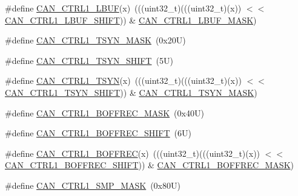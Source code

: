 \begin{DoxyCompactItemize}
\item 
\#define \mbox{\hyperlink{group___c_a_n___register___masks_ga13ecdb7d2b91cd6756605304611656b2}{C\+A\+N\+\_\+\+C\+T\+R\+L1\+\_\+\+L\+B\+UF}}(x)~(((uint32\+\_\+t)(((uint32\+\_\+t)(x)) $<$$<$ \mbox{\hyperlink{group___c_a_n___register___masks_ga1ebb72a42560e1f78bb6f10cfeec8945}{C\+A\+N\+\_\+\+C\+T\+R\+L1\+\_\+\+L\+B\+U\+F\+\_\+\+S\+H\+I\+FT}})) \& \mbox{\hyperlink{group___c_a_n___register___masks_ga91b1b6502a9996e9639d28760d00ee88}{C\+A\+N\+\_\+\+C\+T\+R\+L1\+\_\+\+L\+B\+U\+F\+\_\+\+M\+A\+SK}})
\item 
\#define \mbox{\hyperlink{group___c_a_n___register___masks_ga2ceb4b7bca561020b4899dd2087e5260}{C\+A\+N\+\_\+\+C\+T\+R\+L1\+\_\+\+T\+S\+Y\+N\+\_\+\+M\+A\+SK}}~(0x20\+U)
\item 
\#define \mbox{\hyperlink{group___c_a_n___register___masks_gaff5bfe8a985c0511b72d2518b0bb1708}{C\+A\+N\+\_\+\+C\+T\+R\+L1\+\_\+\+T\+S\+Y\+N\+\_\+\+S\+H\+I\+FT}}~(5\+U)
\item 
\#define \mbox{\hyperlink{group___c_a_n___register___masks_gae6271a14b5458a165d99c9aa425dc0b2}{C\+A\+N\+\_\+\+C\+T\+R\+L1\+\_\+\+T\+S\+YN}}(x)~(((uint32\+\_\+t)(((uint32\+\_\+t)(x)) $<$$<$ \mbox{\hyperlink{group___c_a_n___register___masks_gaff5bfe8a985c0511b72d2518b0bb1708}{C\+A\+N\+\_\+\+C\+T\+R\+L1\+\_\+\+T\+S\+Y\+N\+\_\+\+S\+H\+I\+FT}})) \& \mbox{\hyperlink{group___c_a_n___register___masks_ga2ceb4b7bca561020b4899dd2087e5260}{C\+A\+N\+\_\+\+C\+T\+R\+L1\+\_\+\+T\+S\+Y\+N\+\_\+\+M\+A\+SK}})
\item 
\#define \mbox{\hyperlink{group___c_a_n___register___masks_ga830ac693c34ebcc732acb2649afd87b2}{C\+A\+N\+\_\+\+C\+T\+R\+L1\+\_\+\+B\+O\+F\+F\+R\+E\+C\+\_\+\+M\+A\+SK}}~(0x40\+U)
\item 
\#define \mbox{\hyperlink{group___c_a_n___register___masks_ga0c22289dc934d1dcc577a77f1c7130a4}{C\+A\+N\+\_\+\+C\+T\+R\+L1\+\_\+\+B\+O\+F\+F\+R\+E\+C\+\_\+\+S\+H\+I\+FT}}~(6\+U)
\item 
\#define \mbox{\hyperlink{group___c_a_n___register___masks_gadcca446785b173a8d594c5f23cb5fc20}{C\+A\+N\+\_\+\+C\+T\+R\+L1\+\_\+\+B\+O\+F\+F\+R\+EC}}(x)~(((uint32\+\_\+t)(((uint32\+\_\+t)(x)) $<$$<$ \mbox{\hyperlink{group___c_a_n___register___masks_ga0c22289dc934d1dcc577a77f1c7130a4}{C\+A\+N\+\_\+\+C\+T\+R\+L1\+\_\+\+B\+O\+F\+F\+R\+E\+C\+\_\+\+S\+H\+I\+FT}})) \& \mbox{\hyperlink{group___c_a_n___register___masks_ga830ac693c34ebcc732acb2649afd87b2}{C\+A\+N\+\_\+\+C\+T\+R\+L1\+\_\+\+B\+O\+F\+F\+R\+E\+C\+\_\+\+M\+A\+SK}})
\item 
\#define \mbox{\hyperlink{group___c_a_n___register___masks_ga3f5256ab5fbe54468bce422ba7ee4fbf}{C\+A\+N\+\_\+\+C\+T\+R\+L1\+\_\+\+S\+M\+P\+\_\+\+M\+A\+SK}}~(0x80\+U)
$$
\end{DoxyCompactItemize}
